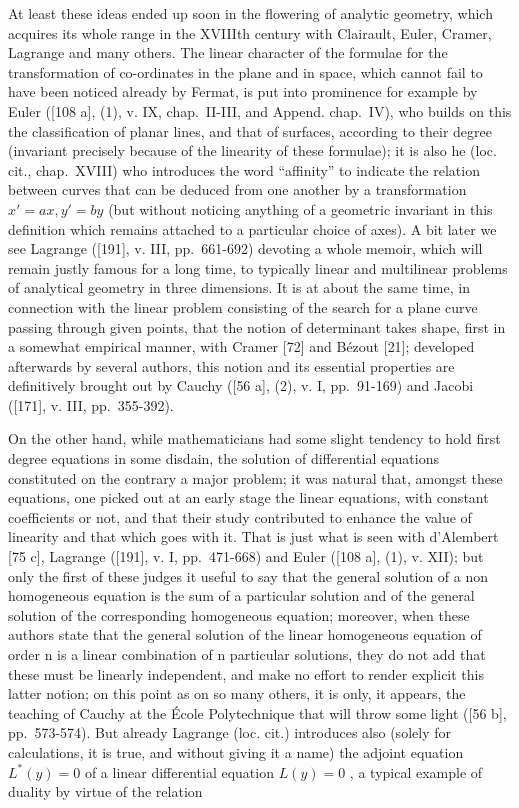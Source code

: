 At least these ideas ended up soon in the flowering of analytic geometry, which acquires its whole range in the XVIIIth century with Clairault, Euler, Cramer, Lagrange and many others. The linear character of the formulae for the transformation of co-ordinates in the plane and in space, which cannot fail to have been noticed already by Fermat, is put into prominence for example by Euler ({[}108 a{]}, (1), v. IX, chap.~II-III, and Append. chap.~IV), who builds on this the classification of planar lines, and that of surfaces, according to their degree (invariant precisely because of the linearity of these formulae); it is also he (loc. cit., chap.~XVIII) who introduces the word ``affinity'' to indicate the relation between curves that can be deduced from one another by a transformation \(x' = ax, y' = by\) (but without noticing anything of a geometric invariant in this definition which remains attached to a particular choice of axes). A bit later we see Lagrange ({[}191{]}, v. III, pp.~661-692) devoting a whole memoir, which will remain justly famous for a long time, to typically linear and multilinear problems of analytical geometry in three dimensions. It is at about the same time, in connection with the linear problem consisting of the search for a plane curve passing through given points, that the notion of determinant takes shape, first in a somewhat empirical manner, with Cramer {[}72{]} and Bézout {[}21{]}; developed afterwards by several authors, this notion and its essential properties are definitively brought out by Cauchy ({[}56 a{]}, (2), v. I, pp.~91-169) and Jacobi ({[}171{]}, v. III, pp.~355-392).

On the other hand, while mathematicians had some slight tendency to hold first degree equations in some disdain, the solution of differential equations constituted on the contrary a major problem; it was natural that, amongst these equations, one picked out at an early stage the linear equations, with constant coefficients or not, and that their study contributed to enhance the value of linearity and that which goes with it. That is just what is seen with d'Alembert {[}75 c{]}, Lagrange ({[}191{]}, v. I, pp.~471-668) and Euler ({[}108 a{]}, (1), v. XII); but only the first of these judges it useful to say that the general solution of a non homogeneous equation is the sum of a particular solution and of the general solution of the corresponding homogeneous equation; moreover, when these authors state that the general solution of the linear homogeneous equation of order n is a linear combination of n particular solutions, they do not add that these must be linearly independent, and make no effort to render explicit this latter notion; on this point as on so many others, it is only, it appears, the teaching of Cauchy at the École Polytechnique that will throw some light ({[}56 b{]}, pp.~573-574). But already Lagrange (loc. cit.) introduces also (solely for calculations, it is true, and without giving it a name) the adjoint equation \(L^{*}(y) = 0\) of a linear differential equation \(L(y) = 0\) , a typical example of duality by virtue of the relation

